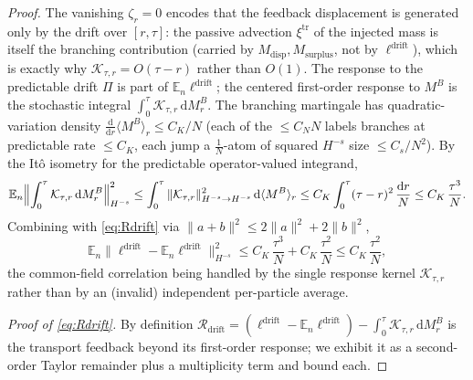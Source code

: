 \documentclass[a4paper,fleqn]{cas-sc}
\theoremstyle{definition}
\theoremstyle{remark}
\begin{document}
\begin{proof}
The vanishing $\zeta_r=0$ encodes that the feedback displacement is generated only by
the drift over $[r,\tau]$: the passive advection $\xi^{\mathrm{tr}}$ of the injected
mass is itself the branching contribution (carried by $M_{\mathrm{disp}},M_{\mathrm{surplus}}$,
not by $\ell^{\mathrm{drift}}$), which is exactly why $\mathcal K_{\tau,r}=O(\tau-r)$
rather than $O(1)$. The response to the predictable drift $\Pi$ is part of
$\mathbb E_n\ell^{\mathrm{drift}}$; the centered first-order response to $M^B$ is the
stochastic integral $\int_0^\tau\mathcal K_{\tau,r}\,\mathrm dM^B_r$. The branching martingale
has quadratic-variation density $\frac{\mathrm d}{\mathrm dr}\langle M^B\rangle_r\le
C_K/N$ (each of the $\le C_NN$ labels branches at predictable rate $\le C_K$, each
jump a $\frac1N$-atom of squared $H^{-s}$ size $\le C_s/N^2$). By the It\^o isometry
for the predictable operator-valued integrand,
\[
\mathbb E_n\Bigl\|\int_0^\tau\mathcal K_{\tau,r}\,\mathrm dM^B_r\Bigr\|_{H^{-s}}^2
\le\int_0^\tau\|\mathcal K_{\tau,r}\|_{H^{-s}\to H^{-s}}^2\,\mathrm d\langle M^B\rangle_r
\le C_K\int_0^\tau(\tau-r)^2\,\frac{\mathrm dr}{N}
\le C_K\,\frac{\tau^3}{N}.
\]
Combining with \eqref{eq:Rdrift} via $\|a+b\|^2\le2\|a\|^2+2\|b\|^2$,
\[
\mathbb E_n\|\ell^{\mathrm{drift}}-\mathbb E_n\ell^{\mathrm{drift}}\|_{H^{-s}}^2
\le C_K\,\frac{\tau^3}{N}+C_K\,\frac{\tau^2}{N}\le C_K\,\frac{\tau^2}{N},
\]
the common-field correlation being handled by the single response kernel
$\mathcal K_{\tau,r}$ rather than by an (invalid) independent per-particle average.

\emph{Proof of \eqref{eq:Rdrift}.} By definition
$\mathcal R_{\mathrm{drift}}=(\ell^{\mathrm{drift}}-\mathbb E_n\ell^{\mathrm{drift}})-\int_0^\tau\mathcal K_{\tau,r}\,\mathrm dM^B_r$
is the transport feedback beyond its first-order response; we exhibit it as a
second-order Taylor remainder plus a multiplicity term and bound each.


\end{proof}
\end{document}

